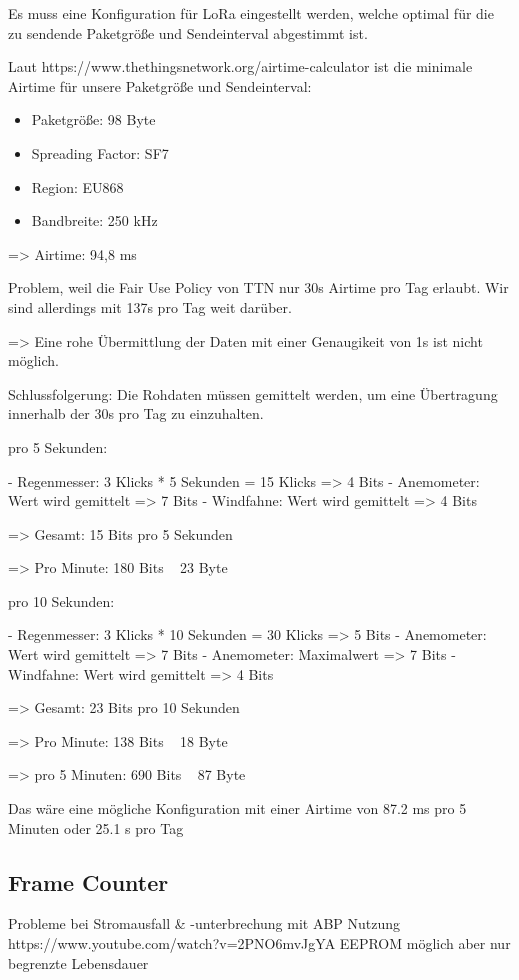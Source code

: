 \documentclass{article}
\begin{document}
      Es muss eine Konfiguration für LoRa eingestellt werden, welche optimal für die zu sendende Paketgröße und Sendeinterval abgestimmt ist.

      Laut https://www.thethingsnetwork.org/airtime-calculator ist die minimale Airtime für unsere Paketgröße und Sendeinterval:

      \begin{itemize}
        \item Paketgröße: 98 Byte
        \item Spreading Factor: SF7
        \item Region: EU868
        \item Bandbreite: 250 kHz
      \end{itemize}

      => Airtime: 94,8 ms

      Problem, weil die Fair Use Policy von TTN nur 30s Airtime pro Tag erlaubt. Wir sind allerdings mit 137s pro Tag weit darüber.

      => Eine rohe Übermittlung der Daten mit einer Genaugikeit von 1s ist nicht möglich.

      Schlussfolgerung: Die Rohdaten müssen gemittelt werden, um eine Übertragung innerhalb der 30s pro Tag zu einzuhalten.

      
      pro 5 Sekunden:

      - Regenmesser: 3 Klicks * 5 Sekunden = 15 Klicks => 4 Bits
      - Anemometer: Wert wird gemittelt => 7 Bits
      - Windfahne: Wert wird gemittelt => 4 Bits

      => Gesamt: 15 Bits pro 5 Sekunden

      => Pro Minute: 180 Bits ~ 23 Byte


      pro 10 Sekunden:

      - Regenmesser: 3 Klicks * 10 Sekunden = 30 Klicks => 5 Bits
      - Anemometer: Wert wird gemittelt => 7 Bits
      - Anemometer: Maximalwert => 7 Bits
      - Windfahne: Wert wird gemittelt => 4 Bits

      => Gesamt: 23 Bits pro 10 Sekunden

      => Pro Minute: 138 Bits ~ 18 Byte

      => pro 5 Minuten: 690 Bits ~ 87 Byte

      Das wäre eine mögliche Konfiguration mit einer Airtime von 87.2 ms pro 5 Minuten oder 25.1 s pro Tag
      
  \subsection{Frame Counter}
  Probleme bei Stromausfall & -unterbrechung mit ABP Nutzung
  https://www.youtube.com/watch?v=2PNO6mvJgYA
  EEPROM möglich aber nur begrenzte Lebensdauer
\end{document}
